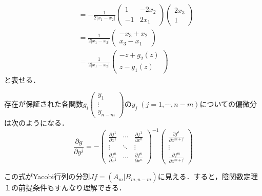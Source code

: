 \documentclass[uplatex, dvipdfmx]{jsreport}
\begin{document}
\begin{example}
\begin{align*}
        &= -\frac{1}{2|x_1-x_2|}\begin{pmatrix}1&-2x_2\\-1&2x_1\end{pmatrix}\begin{pmatrix}2x_3\\1\end{pmatrix}\\
        &= \frac{1}{2|x_1-x_2|}\begin{pmatrix}-x_3+x_2\\x_3-x_1\end{pmatrix}\\
        &= \frac{1}{2|x_1-x_2|}\begin{pmatrix}-z+g_2(z)\\z-g_1(z)\end{pmatrix}
    \end{align*}
    と表せる．
\end{example}
\begin{theorem}
    存在が保証された各関数$g_i\begin{pmatrix}y_1\\\vdots\\y_{n-m}\end{pmatrix}$の$y_j\;(j=1,\cdots,n-m)$についての偏微分は次のようになる．
    \[ \frac{\partial g}{\partial y^j} = - \begin{pmatrix}\frac{\partial f^1}{\partial x^1}&\cdots&\frac{\partial f^1}{\partial x^n}\\\vdots&\ddots&\vdots\\\frac{\partial f^n}{\partial x^1}&\cdots&\frac{\partial f^n}{\partial x^n}\end{pmatrix}^{-1}\begin{pmatrix}\frac{\partial f^1}{\partial x^{m+j}}\\\vdots\\\frac{\partial f^m}{\partial x^{m+j}}\end{pmatrix} \]
\end{theorem}
\begin{remark}
    この式がYacobi行列の分割$Jf=(A_m|B_{m,n-m})$に見える．すると，陰関数定理１の前提条件もすんなり理解できる．
\end{remark}
\end{document}
